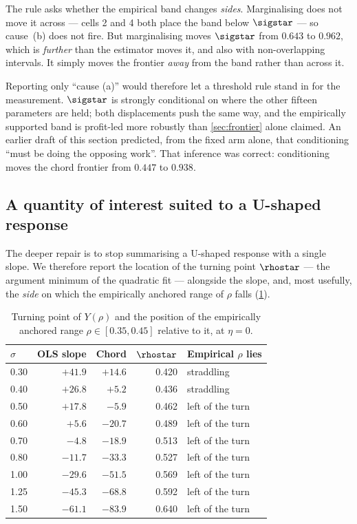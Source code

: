 \begin{declbox}[frametitle={What the rule does not capture, reported anyway}]
The rule asks whether the empirical band changes \emph{sides}. Marginalising
does not move it across --- cells 2 and 4 both place the band below $\sigstar$
--- so cause~(b) does not fire. But marginalising moves $\sigstar$ from $0.643$
to $0.962$, which is \emph{further} than the estimator moves it, and also with
non-overlapping intervals. It simply moves the frontier \emph{away} from the
band rather than across it.

Reporting only ``cause (a)'' would therefore let a threshold rule stand in for
the measurement. $\sigstar$ is strongly conditional on where the other fifteen
parameters are held; both displacements push the same way, and the empirically
supported band is profit-led more robustly than \cref{sec:frontier} alone
claimed. An earlier draft of this section predicted, from the fixed arm alone,
that conditioning ``must be doing the opposing work''. That inference was
correct: conditioning moves the chord frontier from $0.447$ to $0.938$.
\end{declbox}

\subsection{A quantity of interest suited to a U-shaped response}

The deeper repair is to stop summarising a U-shaped response with a single
slope. We therefore report the location of the turning point $\rhostar$ ---
the argument minimum of the quadratic fit --- alongside the slope, and, most
usefully, the \emph{side} on which the empirically anchored range of $\rho$
falls (\cref{tab:turning}).

\begin{table}[htbp]
\centering
\small
\caption{Turning point of $Y(\rho)$ and the position of the empirically
anchored range $\rho \in [0.35, 0.45]$ relative to it, at $\eta = 0$.}
\label{tab:turning}
\begin{tabular}{lrrrl}
\toprule
$\sigma$ & OLS slope & Chord & $\rhostar$ & Empirical $\rho$ lies\\
\midrule
0.30 & $+41.9$ & $+14.6$ & 0.420 & straddling\\
0.40 & $+26.8$ & $+5.2$  & 0.436 & straddling\\
0.50 & $+17.8$ & $-5.9$  & 0.462 & left of the turn\\
0.60 & $+5.6$  & $-20.7$ & 0.489 & left of the turn\\
0.70 & $-4.8$  & $-18.9$ & 0.513 & left of the turn\\
0.80 & $-11.7$ & $-33.3$ & 0.527 & left of the turn\\
1.00 & $-29.6$ & $-51.5$ & 0.569 & left of the turn\\
1.25 & $-45.3$ & $-68.8$ & 0.592 & left of the turn\\
1.50 & $-61.1$ & $-83.9$ & 0.640 & left of the turn\\
\bottomrule
\end{tabular}
\end{table}

